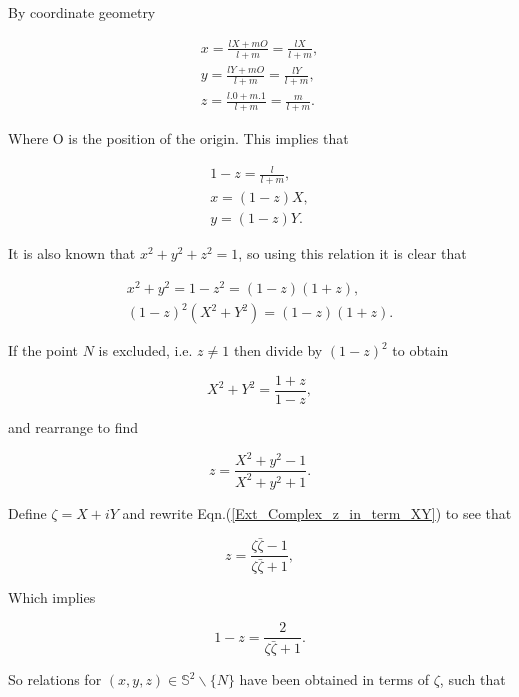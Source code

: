 \noindent By coordinate geometry

\begin{eqnarray*}  
x = \frac{lX + mO}{l+m} = \frac{lX}{l+m}, \\
y = \frac{lY + mO}{l+m} = \frac{lY}{l+m}, \\
z = \frac{l.0+ m.1}{l+m} = \frac{m}{l+m}.
\end{eqnarray*}

\noindent Where O is the position of the origin. This implies that

\begin{eqnarray*}
1-z = \frac{l}{l+m}, \\
x = (1-z)X, \\
y = (1-z)Y.
\end{eqnarray*}

\noindent It is also known that $x^2+ y^2 +z^2 = 1$, so using this relation it is clear that

\begin{eqnarray*}
x^2 + y^2 = 1-z^2 = (1-z) (1+z), \\
(1-z)^2(X^2 +Y^2) = (1-z) (1+z).
\end{eqnarray*}

\noindent If the point $N$ is excluded, i.e. $z \neq 1$ then divide by $(1-z)^2$ to obtain

\begin{equation*} 
X^2 + Y^2 = \frac{1+z}{1-z},
\end{equation*}

\noindent and rearrange to find

\begin{equation}\label{Ext_Complex_z_in_term_XY} 
z = \frac{X^2 + y^2 - 1}{X^2 + y^2 + 1}.
\end{equation}

Define $\zeta = X+ iY$ and rewrite Eqn.(\ref{Ext_Complex_z_in_term_XY}) to see that

\begin{equation*}
z = \frac{\zeta\bar{\zeta} - 1}{\zeta\bar{\zeta} + 1},
\end{equation*}

\noindent Which implies

\begin{equation*}
1- z = \frac{2}{\zeta\bar{\zeta} + 1}.
\end{equation*}

\noindent So relations for $(x,y,z) \in \mathbb{S}^2 \backslash \{N\}$ have been obtained in terms of $\zeta$, such that

